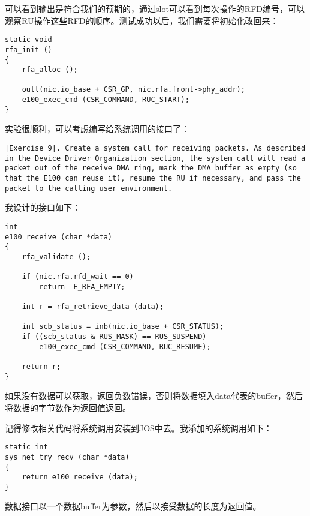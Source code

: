 \documentclass{article}
\begin{document}
\begin{CJK*}{UTF8}{gkai}
可以看到输出是符合我们的预期的，通过slot可以看到每次操作的RFD编号，可以观察RU操作这些RFD的顺序。测试成功以后，我们需要将初始化改回来：

\begin{lstlisting}[style=ccode, title={\scriptsize \ttfamily \bfseries kern/e100.c: rfa\_init()}]
static void
rfa_init () 
{
    rfa_alloc ();

    outl(nic.io_base + CSR_GP, nic.rfa.front->phy_addr);
    e100_exec_cmd (CSR_COMMAND, RUC_START); 
}
\end{lstlisting}

实验很顺利，可以考虑编写给系统调用的接口了：
\newpage

\begin{lstlisting}[style=exercise]
|Exercise 9|. Create a system call for receiving packets. As described in the Device Driver Organization section, the system call will read a packet out of the receive DMA ring, mark the DMA buffer as empty (so that the E100 can reuse it), resume the RU if necessary, and pass the packet to the calling user environment.
\end{lstlisting}

我设计的接口如下：



\begin{lstlisting}[style=ccode, title={\scriptsize \ttfamily \bfseries kern/e100.c: e100\_receive()}]
int 
e100_receive (char *data)
{
    rfa_validate ();

    if (nic.rfa.rfd_wait == 0)
        return -E_RFA_EMPTY;

    int r = rfa_retrieve_data (data);
    
    int scb_status = inb(nic.io_base + CSR_STATUS);
    if ((scb_status & RUS_MASK) == RUS_SUSPEND)
        e100_exec_cmd (CSR_COMMAND, RUC_RESUME); 

    return r;
}
\end{lstlisting}

如果没有数据可以获取，返回负数错误，否则将数据填入data代表的buffer，然后将数据的字节数作为返回值返回。

记得修改相关代码将系统调用安装到JOS中去。我添加的系统调用如下：

\begin{lstlisting}[style=ccode, title={\scriptsize \ttfamily \bfseries kern/syscall.c: sys\_net\_try\_recv()}]
static int
sys_net_try_recv (char *data)
{
    return e100_receive (data);
}
\end{lstlisting}

数据接口以一个数据buffer为参数，然后以接受数据的长度为返回值。


\end{CJK*}
\end{document}
